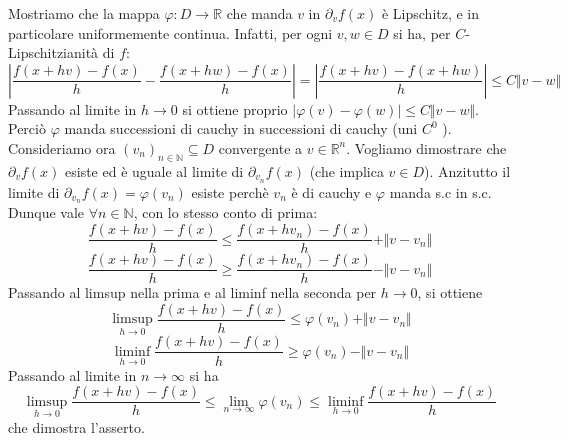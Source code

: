  Mostriamo che la mappa $\varphi: D \rightarrow \mathbb{R}$ che manda $v$ in $\partial_v f(x)$ è Lipschitz, e in particolare uniformemente continua. Infatti, per ogni $v,w \in D$ si ha, per $C$-Lipschitzianità di $f$:
$$  \left \vert \frac{ f(x+hv) - f(x) }{h} - \frac{ f(x+hw) - f(x) }{h} \right  \vert = \left \vert \frac{ f(x+hv) - f(x+hw)}{h} \right \vert \le C \Vert v-w \Vert $$ 
Passando al limite in $h \to 0 $ si ottiene proprio $\vert \varphi(v) - \varphi(w) \vert \le C \Vert v-w \Vert$. Perciò $\varphi$ manda successioni di cauchy in successioni di cauchy (uni $C^0$ ). \newline
Consideriamo ora $(v_n)_{n \in \mathbb{N} } \subseteq D$ convergente a $v \in \mathbb{R}^n$. Vogliamo dimostrare che $\partial_v f (x)$ esiste ed è uguale al limite di $\partial_{v_n} f (x) $ (che implica $v \in D$). Anzitutto il limite di $\partial_{v_n} f(x) = \varphi(v_n) $ esiste perchè $v_n$ è di cauchy e $\varphi$ manda s.c in s.c. Dunque vale $\forall n \in \mathbb{N}$, con lo stesso conto di prima:
$$ \frac{f(x+hv) - f(x) }{h}    \le \frac{ f(x+hv_n) - f(x) }{h} + \Vert v-v_n \Vert $$
$$ \frac{f(x+hv) - f(x)}{h} \ge \frac{ f(x+hv_n) - f(x) }{h} - \Vert v-v_n \Vert $$
Passando al limsup nella prima e al liminf nella seconda per $h \to 0$, si ottiene
$$\limsup_{h \to 0} \frac{f(x+hv) - f(x)}{h} \le \varphi(v_n) + \Vert v- v_n \Vert $$
$$ \liminf_{h \to 0} \frac{f(x+hv) - f(x)}{h} \ge \varphi(v_n) - \Vert v-v_n \Vert $$
Passando al limite in $n \to \infty$ si ha
$$ \limsup_{h \to 0} \frac{f(x+hv) - f(x)}{h} \le \lim_{n \to \infty} \varphi(v_n) \le \liminf_{h \to 0} \frac{f(x+hv) - f(x)}{h} $$
che dimostra l'asserto. 

 
